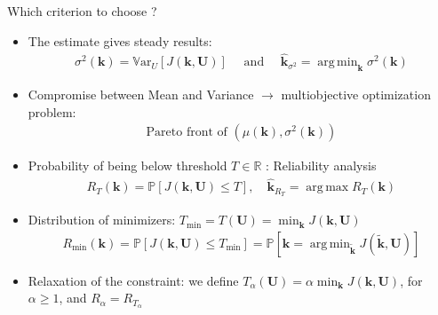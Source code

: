 \documentclass{beamer}
\newlength{\sndcolwid}
\newcommand{\Var}{\mathbb{V}\mathrm{ar}}
\newcommand{\Prob}{\mathbb{P}}
\DeclareMathOperator*{\argmin}{arg\,min}
\DeclareMathOperator*{\argmax}{arg\,max}
\newcommand{\kest}{\hat{\bm{k}}}
\begin{document}
\begin{frame}[t]
\begin{columns}[t]
\begin{column}{\sndcolwid}
\begin{block}{Which criterion to choose ? \nocite{lehman_designing_2004}}
\begin{itemize}
 \item The estimate gives \alert{steady results}:
  \begin{align*}
    \sigma^2(\bm{k}) = \Var_U[J(\bm{k},\bm{U})] \quad\text{ and } \quad \kest_{\sigma^2} = \argmin_{\bm{k}} \sigma^2(\bm{k}) \tag{PCE gradient}
  \end{align*}

 
  \item \alert{Compromise} between Mean and Variance $\to$ multiobjective optimization problem:
  \begin{align*}
    \text{Pareto front of } (\mu(\bm{k}),\sigma^2(\bm{k})) \tag{Layered kriging}
  \end{align*}
\item\alert{Probability of being below threshold $T\in \mathbb{R}$} : Reliability analysis
  \begin{align*}
    R_T(\bm{k}) =  \Prob\left[J(\bm{k},\bm{U}) \leq T\right], \quad \kest_{R_T} = \argmax R_T(\bm{k}) \tag{GP simulations}
  \end{align*}

\item Distribution of minimizers: $T_{\min} = T(\bm{U})  = \min_{\bm{k}} J(\bm{k},\bm{U})$
  \begin{align*}
    R_{\min}(\bm{k}) = \Prob\left[J(\bm{k},\bm{U}) \leq T_{\min}\right] = \Prob\left[\bm{k} = \argmin_{\tilde{\bm{k}}} J(\tilde{\bm{k}},\bm{U}) \right] \tag{Estimation and maximization of density}
  \end{align*}
  
\item Relaxation of the constraint: we define $T_{\alpha}(\bm{U}) = \alpha \min_{\bm{k}} J(\bm{k},\bm{U})$, for $\alpha \geq 1$, and $R_\alpha = R_{T_{\alpha}}$



\end{itemize}

\end{block}


\end{column}
\end{columns}
\end{frame}
\end{document}

